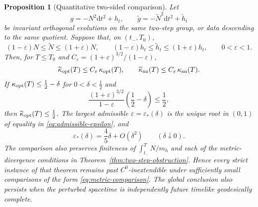 \documentclass[10pt,a4paper]{article}
\numberwithin{equation}{section}
\newtheorem{proposition}[theorem]{Proposition}
\theoremstyle{definition}
\theoremstyle{remark}
\newcommand{\dd}{\mathrm d}
\newcommand{\eps}{\varepsilon}
\begin{document}
\begin{proposition}[Quantitative two-sided comparison]
\label{thm:stability}
Let
\[
 g=-N^2\dd t^2+h_t,\qquad
 \widetilde g=-\widetilde N^2\dd t^2+\widetilde h_t
\]
be invariant orthogonal evolutions on the same two-step group, or data
descending to the same quotient.  Suppose that, on $(t_-,T_0)$,
\begin{equation}
 (1-\eps)N\le\widetilde N\le(1+\eps)N,\qquad
 (1-\eps)h_t\le\widetilde h_t\le(1+\eps)h_t,\qquad 0<\eps<1.
 \label{eq:metric-comparison}
\end{equation}
Then, for $T\le T_0$ and
$C_\eps=(1+\eps)^{3/2}/(1-\eps)$,
\begin{equation}
 \widetilde\kappa_{\rm opt}(T)
 \le C_\eps\,\kappa_{\rm opt}(T),\qquad
 \widetilde\kappa_{\rm an}(T)
 \le C_\eps\,\kappa_{\rm an}(T).
 \label{eq:kappa-stability}
\end{equation}
If $\kappa_{\rm opt}(T)\le\tfrac12-\delta$ for
$0<\delta<\tfrac12$ and
\begin{equation}
 \frac{(1+\eps)^{3/2}}{1-\eps}
 \left(\frac12-\delta\right)\le\frac12,
 \label{eq:admissible-epsilon}
\end{equation}
then $\widetilde\kappa_{\rm opt}(T)\le\tfrac12$.
The largest admissible $\eps=\eps_*(\delta)$ is the unique root in
$(0,1)$ of equality in \eqref{eq:admissible-epsilon}, and
\begin{equation}
 \eps_*(\delta)=\frac45\delta+O(\delta^2)
 \qquad(\delta\downarrow0).
 \label{eq:epsilon-expansion}
\end{equation}
The comparison also preserves finiteness of $\int_{t_-}^T N/m_h$ and
each of the metric-divergence conditions in
Theorem~\ref{thm:two-step-obstruction}.
Hence every strict instance of that theorem remains past
$C^0$-inextendible under sufficiently small comparisons of the form
\eqref{eq:metric-comparison}.
The global conclusion also persists when the perturbed spacetime is
independently future timelike geodesically complete.
\end{proposition}
\end{document}

